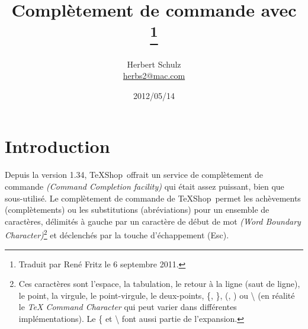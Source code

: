 \documentclass[11pt,french]{article}
\title{Complètement de commande avec \\ \TS\thanks{Traduit par René Fritz le 6 septembre 2011.}}
\author{Herbert Schulz\\\small\href{mailto:herbs2@mac.com}{herbs2@mac.com}}
\date{2012/05/14}
\newcommand{\esckey}{\textsf{Esc}}
\newcommand{\TS}{\textsf{\TeX Shop}}
\begin{document}
\maketitle
\thispagestyle{empty}

\section*{Introduction}

Depuis la version 1.34, \TS\ offrait un service de complètement de commande \emph{(Command Completion 
facility)} qui était assez puissant, bien que sous-utilisé. Le complètement de commande de \TS\ permet les achèvements (complètements) ou les substitutions (abréviations) pour un ensemble de caractères, délimités à gauche par un caractère de début de mot \emph{(Word Boundary Character)}\footnote{Ces caractères sont l'espace, la tabulation, le retour à la ligne (saut de ligne), le point, la virgule, le point-virgule, le deux-points, \{, \}, (, ) ou \textbackslash{} (en réalité le \textsf{\emph{TeX Command Character}} qui peut varier dans différentes implémentations). Le \{{} et \textbackslash{} font aussi partie de l'expansion.} et déclenchés par la touche d'échappement (\esckey).

\end{document}
